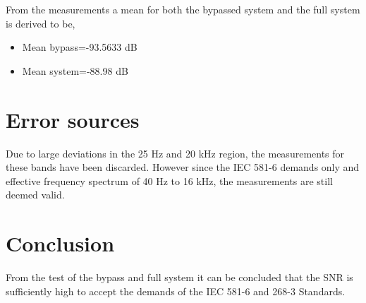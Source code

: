 From the measurements a mean for both the bypassed system and the full system is derived to be,
\begin{itemize}
	\item Mean bypass=-93.5633 dB
	\item Mean system=-88.98 dB
\end{itemize}

\section{Error sources}

Due to large deviations in the 25 Hz and 20 kHz region, the measurements for these bands have been discarded. However since the IEC 581-6 demands only and effective frequency spectrum of 40 Hz to 16 kHz, the measurements are still deemed valid.

\section{Conclusion}
From the test of the bypass and full system it can be concluded that the SNR is sufficiently high to accept the demands of the IEC 581-6 and 268-3 Standards. 
